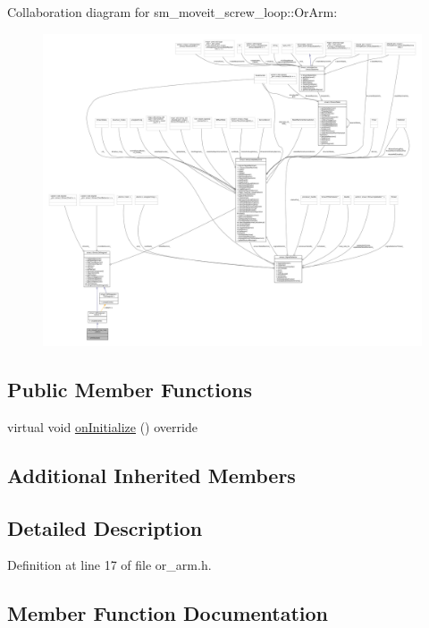Collaboration diagram for sm\+\_\+moveit\+\_\+screw\+\_\+loop\+:\+:Or\+Arm\+:
\nopagebreak
\begin{figure}[H]
\begin{center}
\leavevmode
\includegraphics[width=350pt]{classsm__moveit__screw__loop_1_1OrArm__coll__graph}
\end{center}
\end{figure}
\subsection*{Public Member Functions}
\begin{DoxyCompactItemize}
\item 
virtual void \hyperlink{classsm__moveit__screw__loop_1_1OrArm_a00b06f3d5489f0c403e12f6824ad4bb7}{on\+Initialize} () override
\end{DoxyCompactItemize}
\subsection*{Additional Inherited Members}


\subsection{Detailed Description}


Definition at line 17 of file or\+\_\+arm.\+h.



\subsection{Member Function Documentation}
\mbox{\label{classsm__moveit__screw__loop_1_1OrArm_a00b06f3d5489f0c403e12f6824ad4bb7}} 
